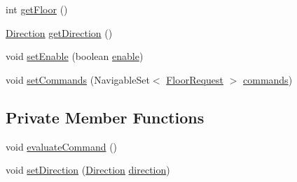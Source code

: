 \begin{DoxyCompactItemize}
\item 
int \mbox{\hyperlink{classcontrol_1_1_impl_command_control_a03e231769f2023d9f381980a34057ad6}{get\+Floor}} ()
\item 
\mbox{\hyperlink{enumcontrol_1_1command_1_1_direction}{Direction}} \mbox{\hyperlink{classcontrol_1_1_impl_command_control_a9734880304099b72e4a65dbfe6a510a1}{get\+Direction}} ()
\item 
void \mbox{\hyperlink{classcontrol_1_1_impl_command_control_a5e4e08d530f169cec15f32d60255ac1c}{set\+Enable}} (boolean \mbox{\hyperlink{classcontrol_1_1_impl_command_control_a80ffb0738b94ae89c8b32d60f9f2fcd0}{enable}})
\item 
void \mbox{\hyperlink{classcontrol_1_1_impl_command_control_a4a32b15e589ca6ad5be4d6288f73d0d6}{set\+Commands}} (Navigable\+Set$<$ \mbox{\hyperlink{classcontrol_1_1command_1_1_floor_request}{Floor\+Request}} $>$ \mbox{\hyperlink{classcontrol_1_1_impl_command_control_afc3d3dfd36511a07dd41e717df3b13f9}{commands}})
\end{DoxyCompactItemize}
\subsection*{Private Member Functions}
\begin{DoxyCompactItemize}
\item 
void \mbox{\hyperlink{classcontrol_1_1_impl_command_control_abba34b3a552395174ddc686b4e3136dd}{evaluate\+Command}} ()
\item 
void \mbox{\hyperlink{classcontrol_1_1_impl_command_control_a122541d8e0d77a6d9ef62a1ee5391ee9}{set\+Direction}} (\mbox{\hyperlink{enumcontrol_1_1command_1_1_direction}{Direction}} \mbox{\hyperlink{classcontrol_1_1_impl_command_control_ae982796e5a99ef48f6b9db87ddb82ad7}{direction}})
\end{DoxyCompactItemize}
